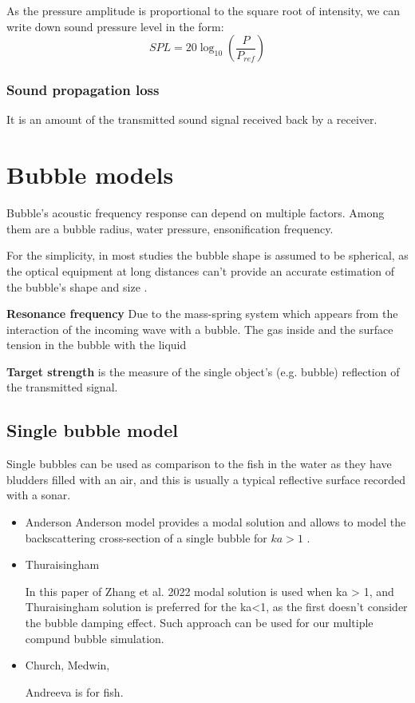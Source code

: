 As the pressure amplitude is proportional to the square root of intensity, we can write down sound pressure level in the form:
\[SPL = 20\log_{10}(\frac{P}{P_{ref}})\]

\subsubsection*{Sound propagation loss} 

It is an amount of the transmitted sound signal received back by a receiver.




\section{Bubble models}
Bubble's acoustic frequency response can depend on multiple factors. Among them are a bubble radius, water pressure, ensonification frequency.

For the simplicity, in most studies the bubble shape is assumed to be spherical, as the optical equipment at long distances can't provide an accurate estimation of the bubble's shape and size \cite[p.2]{zhang_efficient_2022}. 

\textbf{Resonance frequency}
Due to the mass-spring system which appears from the interaction of the incoming wave with a bubble. The gas inside and the surface tension in the bubble with the liquid   


\textbf{Target strength} is the measure of the single object's (e.g. bubble) reflection of the transmitted signal. %
\subsection{Single bubble model}

Single bubbles can be used as comparison to the fish in the water as they have bludders filled with an air, and this is usually a typical reflective surface recorded with a sonar.

\begin{itemize}
    \item Anderson
    Anderson model provides a modal solution and allows to model the backscattering cross-section of a single bubble for $ka > 1$ \cite{anderson_sound_2005}.

    \item Thuraisingham

    In this paper of Zhang et al. 2022 \cite{zhang_efficient_2022} modal solution is used when ka > 1, and Thuraisingham solution is preferred for the ka<1, as the first doesn't consider the bubble damping effect.  Such approach can be used for our multiple compund bubble simulation.

    \item Church, Medwin,

    Andreeva is for fish.

\end{itemize}

